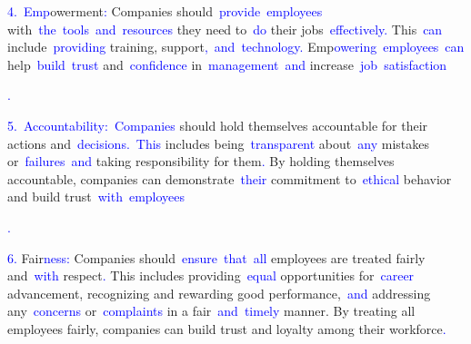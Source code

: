 \documentclass{article}
\begin{document}
\begin{tcolorbox}[colframe=black,colback=white]
{}\textcolor{blue}{4}\textcolor{blue}{.}\textcolor{blue}{~Emp}owerment\textcolor{blue}{:} Companies should\textcolor{blue}{~provide}\textcolor{blue}{~employees} with\textcolor{blue}{~the}\textcolor{blue}{~tools}\textcolor{blue}{~and}\textcolor{blue}{~resources} they need to\textcolor{blue}{~do} their jobs\textcolor{blue}{~effectively}\textcolor{blue}{.} This\textcolor{blue}{~can} include\textcolor{blue}{~providing} training, support\textcolor{blue}{,}\textcolor{blue}{~and}\textcolor{blue}{~technology}\textcolor{blue}{.} Emp\textcolor{blue}{owering}\textcolor{blue}{~employees}\textcolor{blue}{~can} help\textcolor{blue}{~build}\textcolor{blue}{~trust} and\textcolor{blue}{~confidence} in\textcolor{blue}{~management}\textcolor{blue}{~and} increase\textcolor{blue}{~job}\textcolor{blue}{~satisfaction}\textcolor{blue}{.

}\textcolor{blue}{5}\textcolor{blue}{.}\textcolor{blue}{~Accountability}\textcolor{blue}{:}\textcolor{blue}{~Companies} should hold themselves accountable for their actions and\textcolor{blue}{~decisions}\textcolor{blue}{.}\textcolor{blue}{~This} includes being\textcolor{blue}{~transparent} about\textcolor{blue}{~any} mistakes or\textcolor{blue}{~failures}\textcolor{blue}{~and} taking responsibility for them\textcolor{blue}{.} By holding themselves accountable, companies can demonstrate\textcolor{blue}{~their} commitment to\textcolor{blue}{~ethical} behavior and build trust\textcolor{blue}{~with}\textcolor{blue}{~employees}\textcolor{blue}{.

}\textcolor{blue}{6}\textcolor{blue}{.} Fair\textcolor{blue}{ness}\textcolor{blue}{:} Companies should\textcolor{blue}{~ensure}\textcolor{blue}{~that}\textcolor{blue}{~all} employees are treated fairly and\textcolor{blue}{~with} respect\textcolor{blue}{.} This includes providing\textcolor{blue}{~equal} opportunities for\textcolor{blue}{~career} advancement, recognizing and rewarding good performance,\textcolor{blue}{~and} addressing any\textcolor{blue}{~concerns} or\textcolor{blue}{~complaints} in a fair\textcolor{blue}{~and}\textcolor{blue}{~timely} manner. By treating all employees fairly, companies can build trust and loyalty among their workforce\textcolor{blue}{.}\textcolor{blue}{}
\end{tcolorbox}
\end{document}

